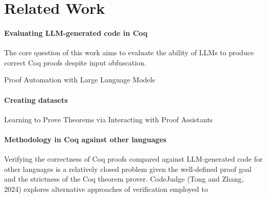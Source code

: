 
\section{Related Work}
\label{sec:related-work}

\paragraph{Evaluating LLM-generated code in Coq}

The core question of this work aims to evaluate
the ability of LLMs to produce correct Coq proofs
despite input obfuscation.

Proof Automation with Large Language Models



\paragraph
{Creating datasets}
Learning to Prove Theorems via
Interacting with Proof Assistants


\paragraph
{Methodology in Coq against other languages}

Verifying the correctness of Coq proofs
compared against LLM-generated code for other
languages is a relatively closed problem
given the well-defined proof goal and the
strictness of the Coq theorem prover.
CodeJudge (Tong and Zhang, 2024) explores
alternative approaches of verification
employed to 

